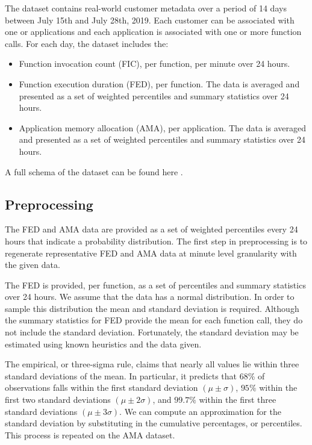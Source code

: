 \documentclass[a4paper,12pt]{report}
\begin{document}
	The dataset contains real-world customer metadata over a period of 14 days between July 15th and July 28th, 2019. Each customer can be associated with one or applications and each application is associated with one or more function calls. For each day, the dataset includes the:
	\begin{itemize}
		\item Function invocation count (FIC), per function, per minute over 24 hours.
		\item Function execution duration (FED), per function. The data is averaged and presented as a set of weighted percentiles and summary statistics over 24 hours.
		\item Application memory allocation (AMA), per application. The data is averaged and presented as a set of weighted percentiles and summary statistics over 24 hours.
	\end{itemize}
	A full schema of the dataset can be found here \cite{AzurePub78:online}.
	
	\subsection{Preprocessing}
	The FED and AMA data are provided as a set of weighted percentiles every 24 hours that indicate a probability distribution. The first step in preprocessing is to regenerate representative FED and AMA data at minute level granularity with the given data.
	
	The FED is provided, per function, as a set of percentiles and summary statistics over 24 hours. We assume that the data has a normal distribution. In order to sample this distribution the mean and standard deviation is required. Although the summary statistics for FED provide the mean for each function call, they do not include the standard deviation. Fortunately, the standard deviation may be estimated using known heuristics and the data given.
	
	The empirical, or three-sigma rule, claims that nearly all values lie within three standard deviations of the mean. In particular, it predicts that 68\% of observations falls within the first standard deviation $(\mu \pm \sigma)$, $95\%$ within the first two standard deviations $(\mu \pm 2\sigma)$, and $99.7\%$ within the first three standard deviations $(\mu \pm 3\sigma)$. We can compute an approximation for the standard deviation by substituting in the cumulative percentages, or percentiles. This process is repeated on the AMA dataset. 
	
\end{document}
